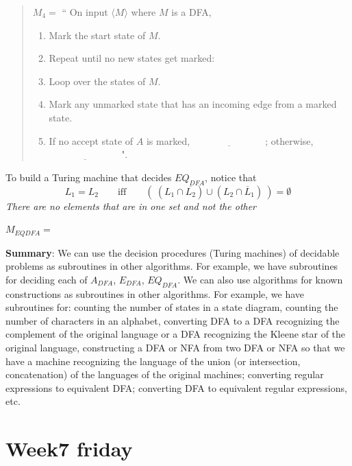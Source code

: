 \documentclass[12pt, oneside]{article}
\begin{document}
  
  \begin{quote}
  $M_4 =  $ `` On  input $\langle M \rangle$ where $M$ is  a  DFA,
  \begin{enumerate}
  \item Mark the start  state  of $M$.
  \item Repeat until no  new states get marked:
  \item \qquad Loop over the states of $M$. 
  \item \qquad Mark any unmarked  state  that  has an incoming  edge  from a marked state.
  \item If  no  accept state of $A$ is  marked, $\underline{\phantom{FILL  IN BLANK}}$;  otherwise, 
  $\underline{\phantom{FILL  IN BLANK}}$".
  \end{enumerate}
  \end{quote}
  
  
  
To build a Turing machine that decides $EQ_{DFA}$, notice that 
\[
L_1 = L_2 \qquad\textrm{iff}\qquad (~(L_1 \cap \overline{L_2}) \cup (L_2 \cap \overline L_1)~) = \emptyset  
\]
{\it There are no elements that are in one set and not the other}


$M_{EQDFA} = $ 


  \vfill
  

  {\bf Summary}:  We can use the decision procedures (Turing machines) of decidable problems
  as subroutines in other algorithms. For example, we have subroutines for deciding each of 
  $A_{DFA}$, $E_{DFA}$, $EQ_{DFA}$.  We can also use algorithms for known constructions
  as subroutines in other algorithms. For example, we have subroutines for: counting the number 
  of states in a state diagram, counting the number of characters in an alphabet, converting DFA
  to a DFA recognizing the complement of the original language or a DFA recognizing the 
  Kleene star of the original language, constructing a DFA or NFA from two DFA or NFA so that 
  we have a machine recognizing the language of the union (or intersection, concatenation)
  of the languages of the original machines; converting regular expressions to equivalent DFA; 
  converting DFA to equivalent regular expressions, etc.

\newpage \vfill
\section*{Week7 friday}
\end{document}
